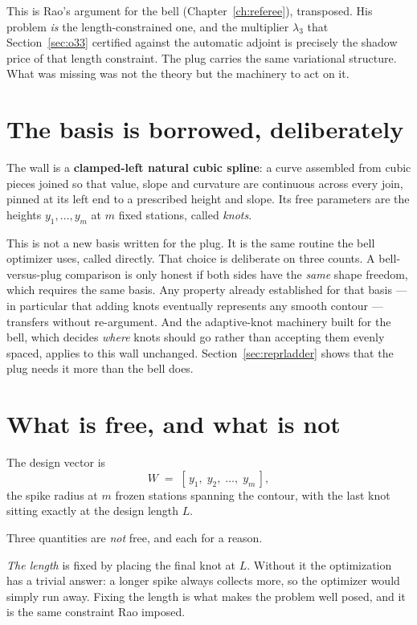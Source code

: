 This is Rao's argument for the bell (Chapter~\ref{ch:referee}),
transposed. His problem \emph{is} the length-constrained one, and the
multiplier $\lambda_3$ that Section~\ref{sec:o33} certified against
the automatic adjoint is precisely the shadow price of that length
constraint. The plug carries the same variational structure. What was
missing was not the theory but the machinery to act on it.

\section{The basis is borrowed, deliberately}

The wall is a \textbf{clamped-left natural cubic spline}: a curve
assembled from cubic pieces joined so that value, slope and curvature
are continuous across every join, pinned at its left end to a
prescribed height and slope. Its free parameters are the heights
$y_1, \dots, y_m$ at $m$ fixed stations, called \emph{knots}.

This is not a new basis written for the plug. It is the same routine
the bell optimizer uses, called directly. That choice is deliberate on
three counts. A bell-versus-plug comparison is only honest if both
sides have the \emph{same} shape freedom, which requires the same
basis. Any property already established for that basis --- in
particular that adding knots eventually represents any smooth contour
--- transfers without re-argument. And the adaptive-knot machinery
built for the bell, which decides \emph{where} knots should go rather
than accepting them evenly spaced, applies to this wall unchanged.
Section~\ref{sec:reprladder} shows that the plug needs it more than
the bell does.

\section{What is free, and what is not}

The design vector is
\begin{equation}
  W \;=\; [\,y_1,\; y_2,\; \dots,\; y_m\,],
\end{equation}
the spike radius at $m$ frozen stations spanning the contour, with the
last knot sitting exactly at the design length $L$.

Three quantities are \emph{not} free, and each for a reason.

\emph{The length} is fixed by placing the final knot at $L$. Without
it the optimization has a trivial answer: a longer spike always
collects more, so the optimizer would simply run away. Fixing the
length is what makes the problem well posed, and it is the same
constraint Rao imposed.

